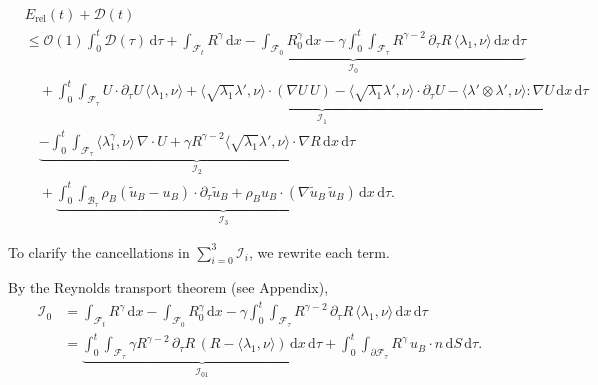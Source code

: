 \documentclass[11pt,twoside,reqno]{amsart}
\numberwithin{equation}{section}
\numberwithin{figure}{section}
\begin{document}
\begin{equation}\label{eq:JL1}
\begin{aligned}
&E_{\mathrm{rel}}(t)+\mathcal{D}(t)
\\&\le \mathcal{O}(1)\int_0^t\mathcal{D}(\tau)\,\mathrm{d}\tau
+\underbrace{\int_{\mathcal{F}_t}R^\gamma\,\mathrm{d}x - \int_{\mathcal{F}_0}R_0^\gamma\,\mathrm{d}x
-\gamma\int_0^t\!\!\int_{\mathcal{F}_\tau} R^{\gamma-2}\,\partial_\tau R\,\langle \lambda_1,\nu\rangle\,\mathrm{d}x\,\mathrm{d}\tau}_{\mathcal{I}_0}\\
&\quad+\underbrace{\int_0^t\!\!\int_{\mathcal{F}_\tau}
  U\cdot \partial_\tau U\,\langle \lambda_1,\nu\rangle
 +\Big\langle \sqrt{\lambda_1}\lambda',\nu\Big\rangle\!\cdot(\nabla U\,U)
 -\Big\langle \sqrt{\lambda_1}\lambda',\nu\Big\rangle\!\cdot \partial_\tau U
 -\Big\langle \lambda'\!\otimes\!\lambda',\nu\Big\rangle\!:\!\nabla U\,\mathrm{d}x\,\mathrm{d}\tau}_{\mathcal{I}_1}\\
&\quad\underbrace{-\int_0^t\!\!\int_{\mathcal{F}_\tau}\langle \lambda_1^\gamma,\nu\rangle\,\nabla\!\cdot U
+\gamma R^{\gamma-2}\Big\langle \sqrt{\lambda_1}\lambda',\nu\Big\rangle\!\cdot\nabla R\,\mathrm{d}x\,\mathrm{d}\tau}_{\mathcal{I}_2}\\
&\quad+\underbrace{\int_0^t\!\!\int_{\mathcal{B}_\tau}
  \rho_B(\tilde u_B-u_B)\cdot \partial_\tau \tilde u_B
 +\rho_B u_B\cdot(\nabla\tilde u_B\,\tilde u_B)\,\mathrm{d}x\,\mathrm{d}\tau}_{\mathcal{I}_3}.
\end{aligned}
\end{equation}

To clarify the cancellations in \(\sum_{i=0}^3 \mathcal{I}_i\), we rewrite each term.

By the Reynolds transport theorem (see Appendix),
\begin{equation}\label{eq:I_0}
\begin{aligned}
\mathcal{I}_0
&=\int_{\mathcal{F}_t}R^\gamma\,\mathrm{d}x - \int_{\mathcal{F}_0}R_0^\gamma\,\mathrm{d}x
  -\gamma\int_0^t\!\!\int_{\mathcal{F}_\tau} R^{\gamma-2}\,\partial_\tau R\,\langle \lambda_1,\nu\rangle\,\mathrm{d}x\,\mathrm{d}\tau\\
&=\underbrace{\int_0^t\!\!\int_{\mathcal{F}_\tau}\gamma R^{\gamma-2}\,\partial_\tau R\,(R-\langle\lambda_1,\nu\rangle)\,\mathrm{d}x\,\mathrm{d}\tau}_{\mathcal{I}_{01}}
  +\int_0^t\!\!\int_{\partial\mathcal{F}_\tau} R^\gamma\,u_B\cdot n\,\mathrm{d}S\,\mathrm{d}\tau.
\end{aligned}
\end{equation}
\end{document}
